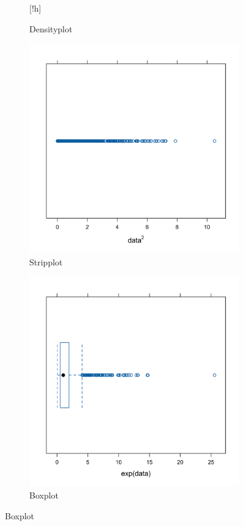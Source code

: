 \documentclass[10pt, a4paper, titlepage]{article}
\begin{document}
\begin{figure}[htbp]
\begin{subfigure}{0.45\textwidth}[!h]
        \caption{Densityplot}
        \label{fig:sub2}
    \end{subfigure}
    \vspace{0.5cm}
    \begin{subfigure}{0.45\textwidth}
        \centering
        \includegraphics[width=\textwidth]{stripplot.png}
        \caption{Stripplot}
        \label{fig:sub3}
    \end{subfigure}
    \hfill
    \begin{subfigure}{0.45\textwidth}
        \centering
        \includegraphics[width=\linewidth]{bwplot.png}
        \caption{Boxplot}
        \label{fig:sub4}
    \end{subfigure}
    

\end{figure}
\end{document}
